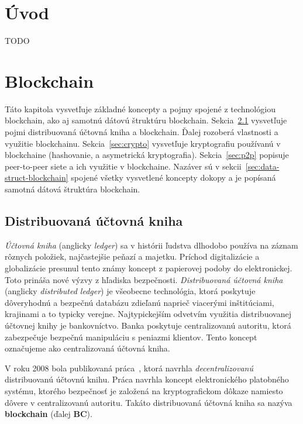 \chapter{Úvod}
TODO

\chapter{Blockchain}\label{chap:blockchain}

Táto kapitola vysvetľuje základné koncepty a pojmy spojené z technológiou blockchain, ako aj samotnú dátovú štruktúru blockchain. Sekcia~\ref{sec:ladger} vysvetľuje pojmi distribuovaná účtovná kniha a blockchain. Ďalej rozoberá vlastnosti a využitie blockchainu. Sekcia~\ref{sec:crypto} vysvetľuje kryptografiu používanú v blockchaine (hashovanie, a asymetrická kryptografia).  Sekcia~\ref{sec:p2p} popisuje peer-to-peer siete a ich využitie v blockchaine. Nazáver sú v sekcii~\ref{sec:data-struct-blockchain} spojené všetky vysvetlené koncepty dokopy a je popísaná samotná dátová štruktúra blockchain.

\section{Distribuovaná účtovná kniha}\label{sec:ladger}
\textit{Účtovná kniha} (anglicky \textit{ledger}) sa v histórii ľudstva dlhodobo používa na záznam rôznych položiek, najčastejšie peňazí a majetku. Príchod digitalizácie a globalizácie presunul tento známy koncept z papierovej podoby do elektronickej. Toto prináša nové výzvy z hľadiska bezpečnosti.
\textit{Distribuovaná účtovná kniha} (anglicky \textit{distributed ledger}) je všeobecne technológia, ktorá poskytuje dôveryhodnú a bezpečnú databázu zdieľanú naprieč viacerými inštitúciami, krajinami a to typicky verejne. Najtypickejším odvetvím využitia distribuovanej účtovnej knihy je bankovníctvo. Banka poskytuje centralizovanú autoritu, ktorá zabezpečuje bezpečnú manipuláciu s peniazmi klientov. Tento koncept označujeme ako centralizovaná účtovná kniha.~\cite{dltUkReport}

V roku 2008 bola publikovaná práca~\cite{satoshiBitcoin}, ktorá navrhla \textit{decentralizovanú} distribuovanú účtovnú knihu. Práca navrhla koncept elektronického platobného systému, ktorého bezpečnosť je založená na kryptografickom dôkaze namiesto dôvere v centralizovanú autoritu. Takáto distribuovaná účtovná kniha sa nazýva \textbf{blockchain} (ďalej \textbf{BC}).
